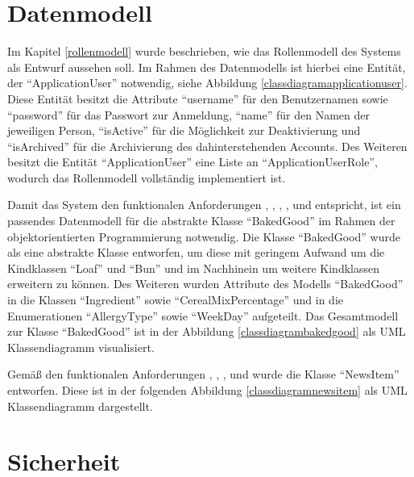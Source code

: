 
\clearpage

\section{Datenmodell}
Im Kapitel \ref{rollenmodell} wurde beschrieben, wie das Rollenmodell des Systems als Entwurf aussehen soll.
Im Rahmen des Datenmodells ist hierbei eine Entität, der \enquote{ApplicationUser} notwendig, siehe Abbildung \ref{classdiagramapplicationuser}. Diese Entität besitzt die Attribute \enquote{username} für den Benutzernamen sowie \enquote{password} für das Passwort zur Anmeldung, \enquote{name} für den Namen der jeweiligen Person, \enquote{isActive} für die Möglichkeit zur Deaktivierung und \enquote{isArchived} für die Archivierung des dahinterstehenden Accounts. Des Weiteren besitzt die Entität \enquote{ApplicationUser} eine Liste an \enquote{ApplicationUserRole}, wodurch das Rollenmodell vollständig implementiert ist.


Damit das System den funktionalen Anforderungen , , , ,  und  entspricht, ist ein passendes Datenmodell für die abstrakte Klasse \enquote{BakedGood} im Rahmen der objektorientierten Programmierung notwendig. Die Klasse \enquote{BakedGood} wurde als eine abstrakte Klasse  entworfen, um diese mit geringem Aufwand um die Kindklassen \enquote{Loaf} und \enquote{Bun} und im Nachhinein um weitere Kindklassen erweitern zu können. Des Weiteren wurden Attribute des Modells \enquote{BakedGood} in die Klassen \enquote{Ingredient} sowie \enquote{CerealMixPercentage} und in die Enumerationen \enquote{AllergyType} sowie \enquote{WeekDay} aufgeteilt. Das  Gesamtmodell zur Klasse \enquote{BakedGood} ist in der Abbildung \ref{classdiagrambakedgood} als UML Klassendiagramm visualisiert.



\newpage

Gemäß den funktionalen Anforderungen , , , und  wurde die Klasse \enquote{NewsItem} entworfen. Diese ist in der folgenden Abbildung \ref{classdiagramnewsitem} als UML Klassendiagramm dargestellt.


\clearpage

\section{Sicherheit}